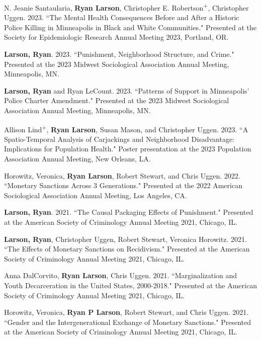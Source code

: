 \documentclass[letterpaper]{article}
\renewenvironment{itemize}{
  \begin{list}{}{
    \setlength{\leftmargin}{1.5em}
  }
}{
  \end{list}
}
\begin{document}
\begin{itemize}
\item N. Jeanie Santaularia, \textbf{Ryan Larson}, Christopher E. Robertson\textsuperscript{+}, Christopher Uggen. 2023. ``The Mental Health Consequences Before and After a Historic Police Killing in Minneapolis in Black and White Communities." Presented at the Society for Epidemiologic Research Annual Meeting 2023, Portland, OR.

\item \textbf{Larson, Ryan}. 2023. ``Punishment, Neighborhood Structure, and Crime." Presented at the 2023 Midwest Sociological Association Annual Meeting, Minneapolis, MN. 

\item \textbf{Larson, Ryan} and Ryan LeCount. 2023. ``Patterns of Support in Minneapolis’ Police Charter Amendment." Presented at the 2023 Midwest Sociological Association Annual Meeting, Minneapolis, MN. 

\item Allison Lind\textsuperscript{+}, \textbf{Ryan Larson}, Susan Mason, and Christopher Uggen. 2023. ``A Spatio-Temporal Analysis of Carjackings and Neighborhood Disadvantage: Implications for Population Health." Poster presentation at the 2023 Population Association Annual Meeting, New Orleans, LA. 

\item Horowitz, Veronica, \textbf{Ryan Larson}, Robert Stewart, and Chris Uggen. 2022.  ``Monetary Sanctions Across 3 Generations." Presented at the 2022 American Sociological Association Annual Meeting, Los Angeles, CA. 

\item \textbf{Larson, Ryan}. 2021. ``The Causal Packaging Effects of Punishment." Presented at the American Society of Criminology Annual Meeting 2021, Chicago, IL. 

\item \textbf{Larson, Ryan}, Christopher Uggen, Robert Stewart, Veronica Horowitz. 2021. ``The Effects of Monetary Sanctions on Recidivism." Presented at the American Society of Criminology Annual Meeting 2021, Chicago, IL. 

\item Anna DalCorvito, \textbf{Ryan Larson}, Chris Uggen. 2021. ``Marginalization and Youth Decarceration in the United States, 2000-2018." Presented at the American Society of Criminology Annual Meeting 2021, Chicago, IL. 

\item Horowitz, Veronica, \textbf{Ryan P Larson}, Robert Stewart, and Chris Uggen. 2021. ``Gender and the Intergenerational Exchange of Monetary Sanctions." Presented at the American Society of Criminology Annual Meeting 2021, Chicago, IL. 


\end{itemize}
\end{document}
